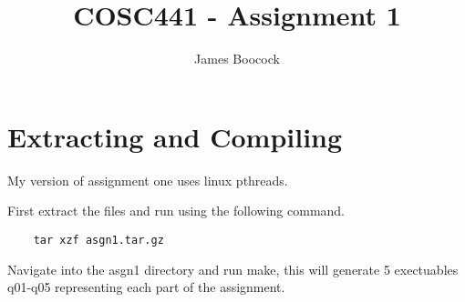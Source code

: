 \documentclass[12pt]{article}
\begin{document}
 
 
\title{COSC441 - Assignment 1}
\author{James Boocock}
\maketitle
\section{Extracting and Compiling}
My version of assignment one uses linux pthreads.

First extract the files and run using the following command.

\begin{verbatim}
    tar xzf asgn1.tar.gz
\end{verbatim}

Navigate into the asgn1 directory and run make, this will generate 5 exectuables q01-q05 representing each part of the assignment.
\end{document}
